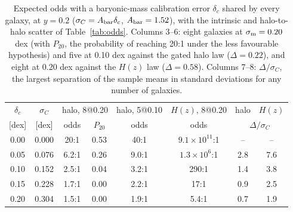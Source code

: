 \documentclass[fleqn,usenatbib]{mnras}
\begin{document}
\begin{table}
\caption{Expected odds with a baryonic-mass calibration error $\delta_c$ shared by every galaxy, at $y=0.2$ ($\sigma_C=A_{\rm bar}\delta_c$, $A_{\rm bar}=1.52$), with the intrinsic and halo-to-halo scatter of Table~\ref{tab:odds}. Columns 3--6: eight galaxies at $\sigma_{\rm m}=0.20$ dex (with $P_{20}$, the probability of reaching 20:1 under the less favourable hypothesis) and five at 0.10 dex against the gated halo law ($\Delta=0.22$), and eight at 0.20 dex against the $H(z)$ law ($\Delta=0.58$). Columns 7--8: $\Delta/\sigma_C$, the largest separation of the sample means in standard deviations for any number of galaxies.}
\label{tab:shared}
\setlength{\tabcolsep}{2.8pt}
\begin{tabular}{@{}cccccccc@{}}
\toprule
$\delta_c$ & $\sigma_C$ & \multicolumn{2}{c}{halo, 8@0.20} & halo, 5@0.10 & $H(z)$, 8@0.20 & halo & $H(z)$\\
{[dex]} & {[dex]} & odds & $P_{20}$ & odds & odds & \multicolumn{2}{c}{$\Delta/\sigma_C$}\\
\midrule
0.00 & 0.000 & 20:1 & 0.53 & 40:1 & $9.1\times10^{11}$:1 & -- & --\\
0.05 & 0.076 & 6.2:1 & 0.26 & 9.0:1 & $1.3\times10^{6}$:1 & 2.8 & 7.6\\
0.10 & 0.152 & 2.5:1 & 0.04 & 3.2:1 & 290:1 & 1.4 & 3.8\\
0.15 & 0.228 & 1.7:1 & 0.00 & 2.2:1 & 17:1 & 0.9 & 2.5\\
0.20 & 0.304 & 1.5:1 & 0.00 & 1.9:1 & 5.4:1 & 0.7 & 1.9\\
\bottomrule
\end{tabular}
\end{table}
\end{document}
